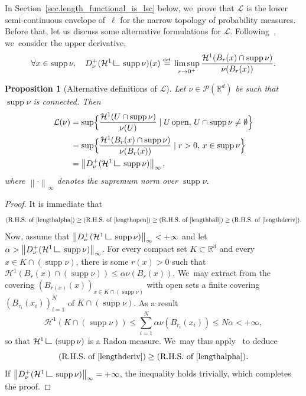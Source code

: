 \documentclass[JEP,XML,SOM,Unicode,NoFloatCountersInSection,published]{cedram}
\newtheorem{proposition}[theorem]{Proposition}
\theoremstyle{definition}
\newcommand{\eqdef}{\ensuremath{\stackrel{\mbox{\upshape\tiny def.}}{=}}}
\newcommand{\norm}[1]{\left\lVert#1\right\rVert}
\newcommand\LM[1]{\hbox{\vrule width.5pt \vbox to#1pt{\vfill \hrule width#1pt height.5pt}}}
\newcommand\LL{{\mathchoice {\>\LM7\>}{\>\LM7\>}{\,\LM5\,}{\,\LM{3.35}\,}}}
\newcommand{\mres}{\LL}
\newcommand\cH{\mathcal{H}}
\newcommand{\RR}{\mathbb{R}}
\DeclareMathOperator{\supp}{supp}
\newcommand{\Benscond}[2]{\Bigl\{#1 \mid #2\Bigr\} }
\begin{document}
In Section~\ref{sec.length_functional_is_lsc} below, we~prove that $\mathcal{L}$ is the lower semi-continuous envelope of~$\ell$ for the narrow topology of probability measures. Before that, let us discuss some alternative formulations for $\mathcal{L}$. Following~\cite[\S 2.4]{ambrosio2000functions}, we~consider the upper derivative,
\begin{equation}
\forall x \in \supp\nu,\quad D^+_\nu(\cH^1\mres \supp\nu)(x) \eqdef \limsup_{r\to 0^+} \frac{\cH^1(B_r(x)\cap \supp \nu)}{\nu(B_r(x))}.
\end{equation}

\begin{proposition}[Alternative definitions of $\mathcal{L}$]
Let $\nu \in \mathcal{P}(\RR^d)$ be such that $\supp \nu$ is connected. Then
\begin{align}
\mathcal{L}(\nu) &=\sup \Benscond{\frac{\cH^1(U \cap \supp \nu)}{\nu(U)}}{U \,\text{open},\, U\cap \supp \nu\neq \emptyset}\label{lengthopen}\\
&=\sup \Benscond{\frac{\cH^1(B_r(x)\cap \supp \nu)}{\nu(B_r(x))}}{r>0,\, x \in \supp \nu} \label{lengthball}\\
&= \norm{D^+_\nu(\cH^1\mres \supp\nu)}_{\infty},\label{lengthderiv}
\end{align}
where $\norm{\cdot}_\infty$ denotes the supremum norm over $\supp \nu$.
\end{proposition}

\begin{proof}
It is immediate that
\begin{equation*}
\left(\mbox{R.H.S. of \eqref{lengthalpha}}\right)\geq \left(\mbox{R.H.S. of \eqref{lengthopen}}\right)\geq \left(\mbox{R.H.S. of \eqref{lengthball}}\right)\geq(\mbox{R.H.S. of \eqref{lengthderiv}}).
\end{equation*}
Now, assume that $\norm{D^+_\nu(\cH^1\mres \supp\nu)}_{\infty}<+\infty$ and let $\alpha > \norm{D^+_\nu(\cH^1\mres \supp\nu)}_{\infty}$. For every compact set $K \subset \RR^d$ and every $x \in K\cap \left(\supp \nu\right)$, there is some $r(x)>0$ such that $\cH^1\left(B_r(x)\cap \left(\supp \nu\right)\right)\leq \alpha \nu(B_r(x))$. We~may extract from the covering $(B_{r(x)}(x))_{x \in K\cap \left(\supp\nu\right)}$ with open sets a finite covering $(B_{r_i}(x_i))_{i=1}^{N}$ of $K\cap \left(\supp \nu\right)$. As a result
\begin{equation*}
\cH^1(K\cap \left(\supp\nu\right))\leq \sum_{i=1}^{N} \alpha \nu(B_{r_i}(x_i))\leq N\alpha<+\infty,
\end{equation*}
so that $\cH^1\mres\left(\supp\nu\right)$ is a Radon measure. We~may thus apply~\cite[Prop.\,2.21]{ambrosio2000functions} to deduce
\begin{equation*}
\left(\mbox{R.H.S. of \eqref{lengthderiv}}\right)\geq(\mbox{R.H.S. of \eqref{lengthalpha}}).
\end{equation*}
If $\norm{D^+_\nu(\cH^1\mres \supp\nu)}_{\infty}=+\infty$, the inequality holds trivially, which completes the proof.
\end{proof}
\end{document}
